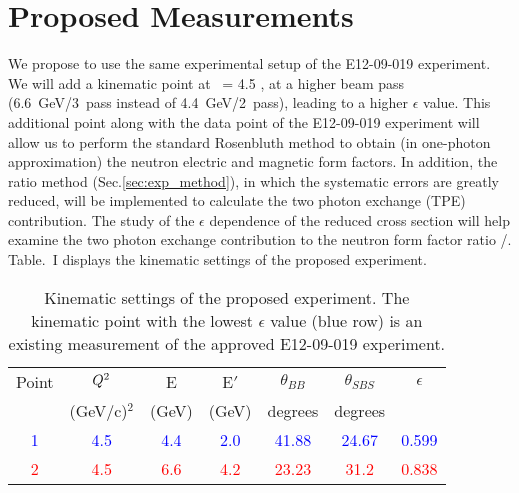 \section{Proposed Measurements} 
\label{prop}

We propose to use the same experimental setup of the E12-09-019 experiment. We will add a kinematic point at \qsq~= 4.5 \gevcsq, at a higher beam pass (6.6~GeV/3~pass instead of 4.4~GeV/2~pass), leading to a higher $\epsilon$ value. This additional point along with the data point of the E12-09-019 experiment will allow us to perform the standard Rosenbluth method to obtain (in one-photon approximation) the neutron electric and magnetic form factors. In addition, the ratio method (Sec.\ref{sec:exp_method}), in which the systematic errors are greatly reduced, will be implemented to calculate  the two photon exchange (TPE) contribution. The study of the $\epsilon$ dependence of the reduced cross section will help examine the two photon exchange contribution to the neutron form factor ratio \gen/\gmn. Table.~I displays the kinematic settings of the proposed experiment. 

\begin{table}[h] 
\centering
\begin{tabular}{|c|c|c|c|c|c|c|}
\hline
\small{Point} & $Q\textsuperscript{2}$  & E & E$'$  & $\theta_{BB}$ & $\theta_{SBS}$ & $\epsilon$ \\
& (GeV/c)$^2$ & (GeV) & (GeV)  &\; degrees\; & \; degrees \;  &   \\
\hline
\textcolor{blue} 1 &\textcolor{blue} {4.5} & \textcolor{blue}{4.4} & \textcolor{blue}{2.0} & \textcolor{blue}{41.88}  & \textcolor{blue}{24.67} &\; \textcolor{blue}{0.599} \;\\
\hline
\textcolor{red}{2} & \textcolor{red}{4.5}  &  \textcolor{red}{6.6}  &  \textcolor{red}{4.2}  & \textcolor{red}{23.23}  &  \textcolor{red}{31.2}  &  \textcolor{red}{0.838} \\
\hline
\end{tabular} 
\caption{Kinematic settings of the proposed experiment. The kinematic point with the lowest $\epsilon$ value (blue row) is an existing measurement of the approved  E12-09-019 experiment.}
\label{tab:propkin}
\end{table}

